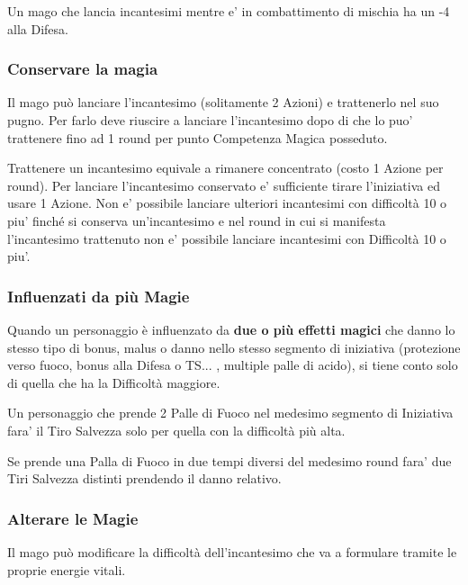 \begin{multicols}{2}
Un mago che lancia incantesimi mentre e' in combattimento di mischia ha un -4 alla Difesa.

\subsubsection{Conservare la magia}

Il mago può lanciare l'incantesimo (solitamente 2 Azioni) e trattenerlo nel suo pugno. Per farlo deve riuscire a lanciare l'incantesimo dopo di che lo puo' trattenere fino ad 1 round per punto Competenza Magica posseduto.

Trattenere un incantesimo equivale a rimanere concentrato (costo 1 Azione per round).
Per lanciare l'incantesimo conservato e' sufficiente tirare l'iniziativa ed usare 1 Azione. Non e' possibile lanciare ulteriori incantesimi con difficoltà 10 o piu' finché si conserva un'incantesimo e nel round in cui si manifesta l'incantesimo trattenuto non e' possibile lanciare incantesimi con Difficoltà 10 o piu'.

\subsubsection{Influenzati da più Magie}

Quando un personaggio è influenzato da \textbf{due o più effetti magici} che danno lo stesso tipo di bonus, malus o danno nello stesso segmento di iniziativa (protezione verso fuoco, bonus alla Difesa o TS... , multiple palle di acido), si tiene conto solo di quella che ha la Difficoltà maggiore.

Un personaggio che prende 2 Palle di Fuoco nel medesimo segmento di Iniziativa fara' il Tiro Salvezza solo per quella con la difficoltà più alta.

Se prende una Palla di Fuoco in due tempi diversi del medesimo round fara' due Tiri Salvezza distinti prendendo il danno relativo.

\subsubsection{Alterare le Magie}

Il mago può modificare la difficoltà dell'incantesimo che va a formulare tramite le proprie energie vitali.


\end{multicols}

